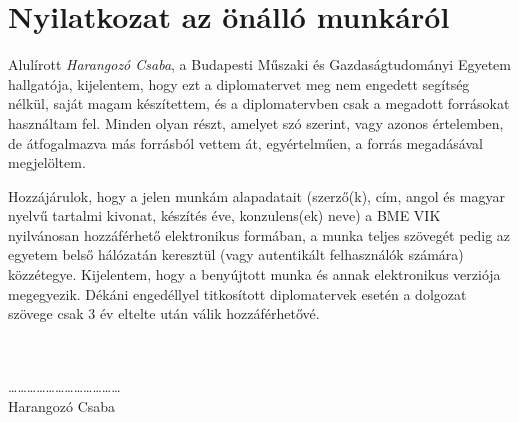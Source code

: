 
\thispagestyle{empty}
\section*{Nyilatkozat az önálló munkáról}

\vfill

\noindent{}Alulírott \emph{Harangozó Csaba}, a Budapesti Műszaki és
Gazdaságtudományi Egyetem hallgatója, kijelentem, hogy ezt a
diplomatervet meg nem engedett segítség nélkül, saját magam
készítettem, és a diplomatervben csak a megadott forrásokat használtam
fel. Minden olyan részt, amelyet szó szerint, vagy azonos értelemben,
de átfogalmazva más forrásból vettem át, egyértelműen, a forrás
megadásával megjelöltem.

Hozzájárulok, hogy a jelen munkám alapadatait (szerző(k), cím, angol és magyar nyelvű tartalmi kivonat, készítés éve, konzulens(ek) neve) a BME VIK nyilvánosan hozzáférhető elektronikus formában, a munka teljes szövegét pedig az egyetem belső hálózatán keresztül (vagy autentikált felhasználók számára) közzétegye. Kijelentem, hogy a benyújtott munka és annak elektronikus verziója megegyezik. Dékáni engedéllyel titkosított diplomatervek esetén a dolgozat szövege csak 3 év eltelte után válik hozzáférhetővé.

\vfill

\begin{multicols}{2}
\begin{center}
  \hspace{1cm}\\
  \hspace{1cm}\\
  \dots\dots\dots\dots\dots\dots\dots\dots\dots\dots\dots\dots\\
  Harangozó Csaba
\end{center}
\end{multicols}